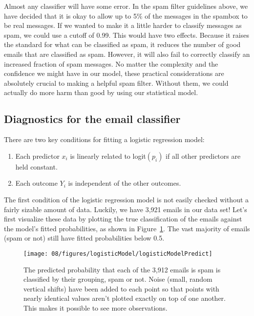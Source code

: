 Almost any classifier will have some error. In the spam filter guidelines above, we have decided that it is okay to allow up to 5\% of the messages in the spambox to be real messages. If we wanted to make it a little harder to classify messages as spam, we could use a cutoff of 0.99. This would have two effects. Because it raises the standard for what can be classified as spam, it reduces the number of good emails that are classified as spam. However, it will also fail to correctly classify an increased fraction of spam messages. No matter the complexity and the confidence we might have in our model, these practical considerations are absolutely crucial to making a helpful spam filter. Without them, we could actually do more harm than good by using our statistical model.


\subsection{Diagnostics for the email classifier}

\begin{termBox}{
There are two key conditions for fitting a logistic regression model: \vspace{-1.5mm}
\begin{enumerate}
\setlength{\itemsep}{0mm}
\item Each predictor $x_i$ is linearly related to logit$(p_i)$ if all other predictors are held constant.
\item Each outcome $Y_i$ is independent of the other outcomes.
\end{enumerate}}
\end{termBox}

The first condition of the logistic regression model is not easily checked without a fairly sizable amount of data. Luckily, we have 3,921 emails in our data set! Let's first visualize these data by plotting the true classification of the emails against the model's fitted probabilities, as shown in Figure~\ref{logisticModelPredict}. The vast majority of emails (spam or not) still have fitted probabilities below 0.5.

\begin{figure}[h]
\centering
\texttt{[image: 08/figures/logisticModel/logisticModelPredict]}
\caption{The predicted probability that each of the 3,912 emails is spam is classified by their grouping, spam or not. Noise (small, random vertical shifts) have been added to each point so that points with nearly identical values aren't plotted exactly on top of one another. This makes it possible to see more observations.}
\label{logisticModelPredict}
\end{figure}


